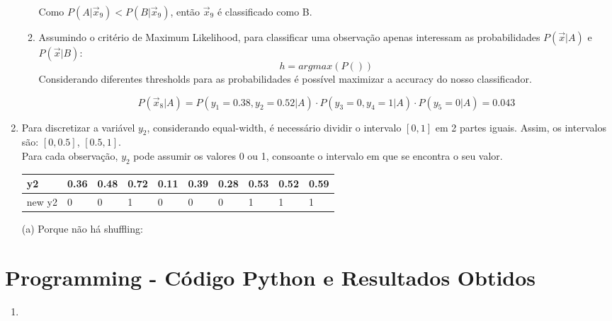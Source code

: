 \documentclass[a4paper,12pt]{article} %
\begin{document}
\begin{enumerate}
\begin{enumerate}
Como $P(A|\vec{x}_9) < P(B|\vec{x}_9)$, então $\vec{x}_9$ é classificado como B. 

\item 
Assumindo o critério de Maximum Likelihood, para classificar uma observação apenas interessam as probabilidades $P(\vec{x}|A)$ e $P(\vec{x}|B)$:
\begin{equation*}
    h = argmax(P())
\end{equation*}
Considerando diferentes thresholds para as probabilidades é possível maximizar a accuracy do nosso classificador.

\begin{equation*}
    P(\vec{x}_8|A) = P(y_1=0.38,y_2=0.52|A) \cdot P(y_3=0,y_4=1|A) \cdot P(y_5=0|A) = 0.043
\end{equation*}

\end{enumerate}

\item

Para discretizar a variável $y_2$, considerando equal-width, é necessário dividir o intervalo $[0,1]$ em 2 partes iguais. 
Assim, os intervalos são: $[0,0.5]$, $[0.5,1]$. \\

Para cada observação, $y_2$ pode assumir os valores 0 ou 1, consoante o intervalo em que se encontra o seu valor. \\

\begin{table}[]
    \begin{tabular}{l|lllllllll}
    y2     & 0.36 & 0.48 & 0.72 & 0.11 & 0.39 & 0.28 & 0.53 & 0.52 & 0.59 \\ \hline
    new y2 & 0    & 0    & 1    & 0    & 0    & 0    & 1    & 1    & 1   
    \end{tabular}
    \end{table}

(a)
Porque não há shuffling:





\end{enumerate}

\clearpage
\section*{Programming - Código Python e Resultados Obtidos}

\begin{enumerate}
    \item 
    
\end{enumerate}
\end{document}

